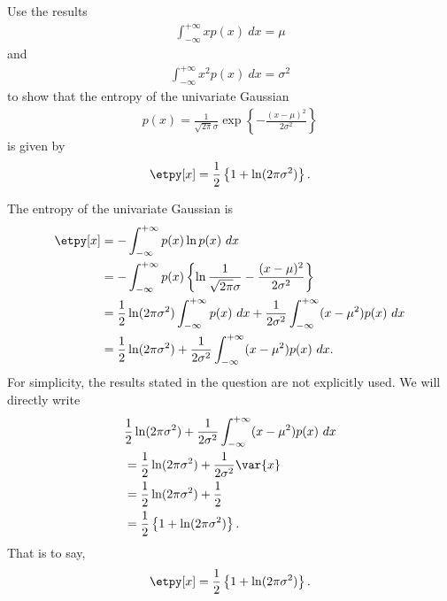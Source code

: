 \begin{question}{1.35}
	Use the results
	\begin{align*}
		\int_{-\infty}^{+\infty} xp(x)\ dx = \mu
	\end{align*}
	and
	\begin{align*}
		\int_{-\infty}^{+\infty} x^2p(x)\ dx = \sigma^2
	\end{align*}
	to show that the entropy of the univariate Gaussian
	\begin{align*}
		p(x) = \frac{1}{\sqrt{2\pi}\sigma}\exp\left\{ -\frac{(x - \mu)^2}{2\sigma^2} \right\}
	\end{align*}
	is given by
	\begin{align}
		\etpy[x] = \frac{1}{2}\left\{ 1 + \ln(2\pi\sigma^2) \right\}.
	\end{align}
\end{question}

\begin{answer}{}
	The entropy of the univariate Gaussian is
	\begin{align}
		\etpy[x] &= -\int_{-\infty}^{+\infty} p(x)\ln p(x)\ dx\\
		&= -\int_{-\infty}^{+\infty} p(x) \left\{ \ln\frac{1}{\sqrt{2\pi}\sigma} - \frac{(x - \mu)^2}{2\sigma^2} \right\}\\
		&= \frac{1}{2}\ln(2\pi\sigma^2)\int_{-\infty}^{+\infty} p(x)\ dx + \frac{1}{2\sigma^2}\int_{-\infty}^{+\infty} (x - \mu^2)p(x)\ dx\\
		&= \frac{1}{2}\ln(2\pi\sigma^2) + \frac{1}{2\sigma^2}\int_{-\infty}^{+\infty} (x - \mu^2)p(x)\ dx.
	\end{align}
	For simplicity, the results stated in the question are not explicitly used. We will directly write
	\begin{align}
		&\frac{1}{2}\ln(2\pi\sigma^2) + \frac{1}{2\sigma^2}\int_{-\infty}^{+\infty} (x - \mu^2)p(x)\ dx\\
		&= \frac{1}{2}\ln(2\pi\sigma^2) + \frac{1}{2\sigma^2} \var{x}\\
		&= \frac{1}{2}\ln(2\pi\sigma^2) + \frac{1}{2}\\
		&= \frac{1}{2}\left\{ 1 + \ln(2\pi\sigma^2)  \right\}.
	\end{align}
	That is to say,
	\begin{align}
		\etpy[x] = \frac{1}{2}\left\{ 1 + \ln(2\pi\sigma^2)  \right\}.
	\end{align}
\end{answer}